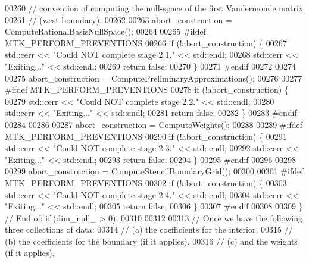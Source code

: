 \begin{DoxyCode}
{{00260     \textcolor{comment}{// convention of computing the null-space of the first Vandermonde matrix}
00261     \textcolor{comment}{// (west boundary).}
00262 
00263     abort\_construction = ComputeRationalBasisNullSpace();
00264 
00265 \textcolor{preprocessor}{    #ifdef MTK\_PERFORM\_PREVENTIONS}
00266     \textcolor{keywordflow}{if} (!abort\_construction) \{
00267       std::cerr << \textcolor{stringliteral}{"Could NOT complete stage 2.1."} << std::endl;
00268       std::cerr << \textcolor{stringliteral}{"Exiting..."} << std::endl;
00269       \textcolor{keywordflow}{return} \textcolor{keyword}{false};
00270     \}
00271 \textcolor{preprocessor}{    #endif}
00272 
00274 
00275     abort\_construction = ComputePreliminaryApproximations();
00276 
00277 \textcolor{preprocessor}{    #ifdef MTK\_PERFORM\_PREVENTIONS}
00278     \textcolor{keywordflow}{if} (!abort\_construction) \{
00279       std::cerr << \textcolor{stringliteral}{"Could NOT complete stage 2.2."} << std::endl;
00280       std::cerr << \textcolor{stringliteral}{"Exiting..."} << std::endl;
00281       \textcolor{keywordflow}{return} \textcolor{keyword}{false};
00282     \}
00283 \textcolor{preprocessor}{    #endif}
00284 
00286 
00287     abort\_construction = ComputeWeights();
00288 
00289 \textcolor{preprocessor}{    #ifdef MTK\_PERFORM\_PREVENTIONS}
00290     \textcolor{keywordflow}{if} (!abort\_construction) \{
00291       std::cerr << \textcolor{stringliteral}{"Could NOT complete stage 2.3."} << std::endl;
00292       std::cerr << \textcolor{stringliteral}{"Exiting..."} << std::endl;
00293       \textcolor{keywordflow}{return} \textcolor{keyword}{false};
00294     \}
00295 \textcolor{preprocessor}{    #endif}
00296 
00298 
00299     abort\_construction = ComputeStencilBoundaryGrid();
00300 
00301 \textcolor{preprocessor}{    #ifdef MTK\_PERFORM\_PREVENTIONS}
00302     \textcolor{keywordflow}{if} (!abort\_construction) \{
00303       std::cerr << \textcolor{stringliteral}{"Could NOT complete stage 2.4."} << std::endl;
00304       std::cerr << \textcolor{stringliteral}{"Exiting..."} << std::endl;
00305       \textcolor{keywordflow}{return} \textcolor{keyword}{false};
00306     \}
00307 \textcolor{preprocessor}{    #endif}
00308 
00309   \} \textcolor{comment}{// End of: if (dim\_null\_ > 0);}
00310 
00312 
00313   \textcolor{comment}{// Once we have the following three collections of data:}
00314   \textcolor{comment}{//   (a) the coefficients for the interior,}
00315   \textcolor{comment}{//   (b) the coefficients for the boundary (if it applies),}
00316   \textcolor{comment}{//   (c) and the weights (if it applies),}
}}
\end{DoxyCode}
